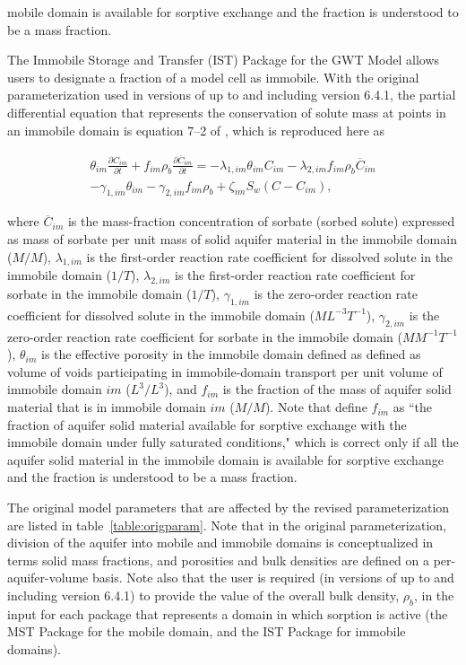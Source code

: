 mobile domain is available for sorptive exchange and the fraction is understood to be a mass fraction.

The Immobile Storage and Transfer (IST) Package for the GWT Model allows users to designate a fraction of a model cell as immobile. With the original parameterization used in versions of \mf up to and including version 6.4.1, the partial differential equation that represents the conservation of solute mass at points in an immobile domain is equation 7--2 of \cite{modflow6gwt}, which is reproduced here as 

\begin{equation}
\label{eqn:gwtistpdeorig}
\begin{split}
\theta_{im} \frac{\partial C_{im} }{\partial t} + f_{im} \rho_b \frac{\partial \overline{C}_{im}}{\partial t} = 
- \lambda_{1,im} \theta_{im} C_{im} - \lambda_{2,im}  f_{im} \rho_b \overline{C}_{im} \\
- \gamma_{1,im} \theta_{im} - \gamma_{2,im} f_{im}  \rho_b 
+ \zeta_{im} S_w \left ( C - C_{im} \right ),
\end{split}
\end{equation}

\noindent where $\overline{C}_{im}$ is the mass-fraction concentration of sorbate (sorbed solute) expressed as mass of sorbate per unit mass of solid aquifer material in the immobile domain ($M/M$), $\lambda_{1,im}$ is the first-order reaction rate coefficient for dissolved solute in the immobile domain ($1/T$), $\lambda_{2,im}$ is the first-order reaction rate coefficient for sorbate in the immobile domain ($1/T$), $\gamma_{1,im}$ is the zero-order reaction rate coefficient for dissolved solute in the immobile domain ($ML^{-3}T^{-1}$), $\gamma_{2,im}$ is the zero-order reaction rate coefficient for sorbate in the immobile domain ($M M^{-1}T^{-1}$), $\theta_{im}$ is the effective porosity in the immobile domain defined as defined as volume of voids participating in immobile-domain transport per unit volume of immobile domain $im$ ($L^3/L^3$), and $f_{im}$ is the fraction of the mass of aquifer solid material that is in immobile domain $im$ ($M/M$). Note that \cite{modflow6gwt} define $f_{im}$ as ``the fraction of aquifer solid material available for sorptive exchange with the immobile domain under fully saturated conditions," which is correct only if all the aquifer solid material in the immobile domain is available for sorptive exchange and the fraction is understood to be a mass fraction.

The original model parameters that are affected by the revised parameterization are listed in table~\ref{table:origparam}. Note that in the original parameterization, division of the aquifer into mobile and immobile domains is conceptualized in terms solid mass fractions, and porosities and bulk densities are defined on a per-aquifer-volume basis. Note also that the user is required (in versions of \mf up to and including version 6.4.1) to provide the value of the overall bulk density, $\rho_b$, in the input for each package that represents a domain in which sorption is active (the MST Package for the mobile domain, and the IST Package for immobile domains).

